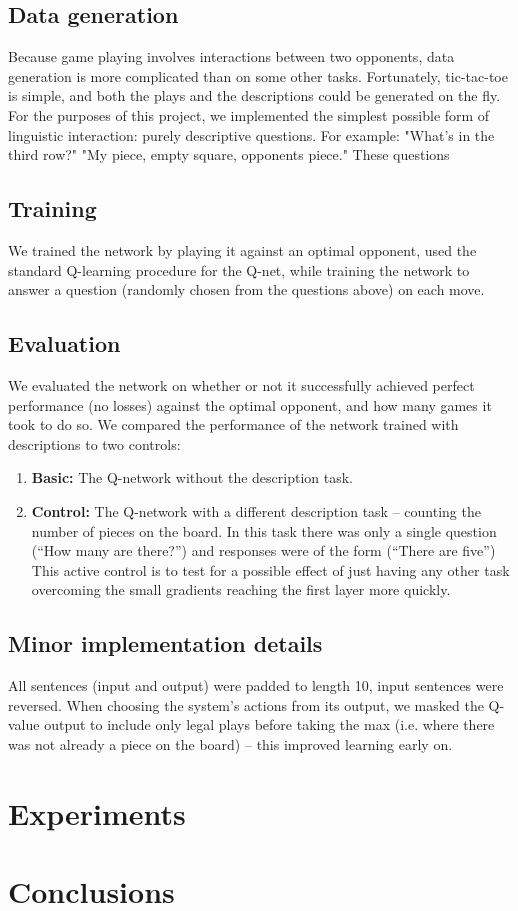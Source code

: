 \documentclass{article} %
\begin{document}
\subsection{Data generation}
Because game playing involves interactions between two opponents, data generation is more complicated than on some other tasks. Fortunately, tic-tac-toe is simple, and both the plays and the descriptions could be generated on the fly. For the purposes of this project, we implemented the simplest possible form of linguistic interaction: purely descriptive questions. For example: "What's in the third row?" "My piece, empty square, opponents piece." These questions

\subsection{Training}
We trained the network by playing it against an optimal opponent, used the standard Q-learning procedure for the Q-net, while training the network to answer a question (randomly chosen from the questions above) on each move.

\subsection{Evaluation}
We evaluated the network on whether or not it successfully achieved perfect performance (no losses) against the optimal opponent, and how many games it took to do so. We compared the performance of the network trained with descriptions to two controls:
\begin{enumerate}
\item \textbf{Basic:} The Q-network without the description task.
\item \textbf{Control:} The Q-network with a different description task -- counting the number of pieces on the board. In this task there was only a single question (``How many are there?'') and responses were of the form (``There are five'') This active control is to test for a possible effect of just having any other task overcoming the small gradients reaching the first layer more quickly.
\end{enumerate}

\subsection{Minor implementation details}
All sentences (input and output) were padded to length 10, input sentences were reversed. When choosing the system's actions from its output, we masked the Q-value output to include only legal plays before taking the max (i.e. where there was not already a piece on the board) -- this improved learning early on.

\section{Experiments}

\section{Conclusions}



\end{document}
